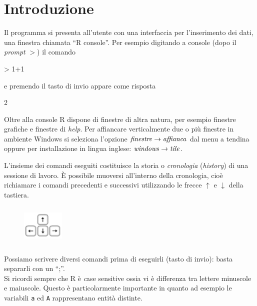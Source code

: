 \documentclass[onecolumn,11pt]{book}
\begin{document}
\section{Introduzione}
Il programma si presenta all'utente con una interfaccia per l'inserimento dei dati, una finestra chiamata ``\textsf{R} console''. Per esempio digitando a console (dopo il \textit{prompt} $>$) il comando
\begin{Schunk}
\begin{Sinput}
> 1+1
\end{Sinput}
\end{Schunk}
e premendo il tasto di invio appare come risposta
\begin{Schunk}
\begin{Soutput}
[1] 2
\end{Soutput}
\end{Schunk}
Oltre alla console
\textsf{R} dispone di finestre di altra natura, per esempio finestre grafiche e finestre di {\it help}. Per affiancare verticalmente due o pi\`u finestre in ambiente {\textsf Windows} si seleziona l'opzione ${\it finestre} \rightarrow {\it affianca}$ dal menu a tendina
oppure per installazione in lingua inglese:  ${\it windows} \rightarrow{\it  tile}$. 
 
L'insieme dei comandi eseguiti costituisce la storia o \textit{cronologia} (\textit{history}) 
 di una sessione di lavoro. \`E possibile muoversi all'interno della cronologia, cio\`e richiamare i comandi precedenti e successivi utilizzando le frecce $\uparrow$ e $\downarrow$ della tastiera.\\
\begin{figure}
     \includegraphics[height=20mm,width=20mm]{../grafici/Tastisugiu.png}
 \vspace{-20pt}  
\end{figure}Possiamo scrivere diversi comandi prima di eseguirli (tasto di invio): basta separarli con un  ``;''.\\
Si ricordi sempre che \textsf{R} \`e {\emph case sensitive} ossia vi \`e differenza tra lettere minuscole e maiuscole.  Questo \`e particolarmente importante in quanto ad esempio le variabili \texttt{a} ed \texttt{A} rappresentano entit\`a distinte.
\end{document}
